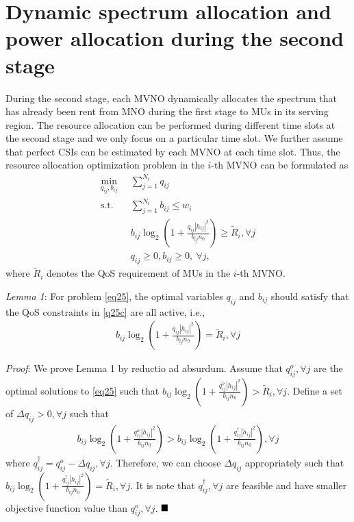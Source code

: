 \documentclass[journal]{IEEEtran}
\begin{document}
\section{Dynamic spectrum allocation and power allocation during the second stage}
During the second stage, each MVNO dynamically allocates the spectrum that has already been rent from MNO during the first stage to MUs in its serving region. The resource allocation can be performed during different time slots at the second stage and we only focus on a particular time slot. We further assume that perfect CSIs can be estimated by each MVNO at each time slot. Thus, the resource allocation optimization problem in the $i$-th MVNO can be formulated as
\begin{subequations}\label{eq25}
	\begin{align}
	\min_{q_{ij}, b_{ij}}\ & \sum\limits_{j = 1}^{N_i} q_{ij} \label{q25a} \\ \mbox{s.t.} \quad &  \sum\limits_{j = 1}^{N_i} b_{ij} \leq w_i \label{q25b} \\ \quad &  b_{ij}\log_2\left(1 + \frac{q_{ij}\left|h_{ij}\right|^2}{b_{ij}n_0}\right) \geq \tilde{R}_i, \forall j \label{q25c}\\
	& q_{ij} \geq 0, b_{ij} \geq 0, \ \forall j, \label{q25d}
	\end{align}
\end{subequations}
where $\tilde{R}_i$ denotes the QoS requirement of MUs in the $i$-th MVNO.

\textit{Lemma 1}: For problem \eqref{eq25}, the optimal variables $q_{ij}$ and $b_{ij}$ should satisfy that the QoS constraints in \eqref{q25c} are all active, i.e., 
\begin{align} \label{q26}
b_{ij}\log_2\left(1 + \frac{q_{ij}\left|h_{ij}\right|^2}{b_{ij}n_0}\right) = \tilde{R}_i,  \forall j
\end{align}

\textit{Proof}:  
We prove Lemma 1 by reductio ad absurdum. Assume that $q_{ij}^o, \forall j$ are the optimal solutions to \eqref{eq25} such that $b_{ij}\log_2\left(1 + \frac{q_{ij}^o\left|h_{ij}\right|^2}{b_{ij}n_0}\right) > \tilde{R}_i, \forall j$. Define a set of $\Delta q_{ij} > 0, \forall j$ such that 
\begin{align}
b_{ij}\log_2\left(1 + \frac{q_{ij}^o\left|h_{ij}\right|^2}{b_{ij}n_0}\right) > b_{ij}\log_2\left(1 + \frac{q_{ij}^\dag\left|h_{ij}\right|^2}{b_{ij}n_0}\right), \forall j
\end{align}
where $q_{ij}^\dag = q_{ij}^o - \Delta q_{ij}, \forall j$. Therefore, we can choose $\Delta q_{ij}$ appropriately such that $b_{ij}\log_2\left(1 + \frac{q_{ij}^\dag\left|h_{ij}\right|^2}{b_{ij}n_0}\right) = \tilde{R}_i, \forall j$. It is note that $q_{ij}^\dag, \forall j$ are feasible and have smaller objective function value than $q_{ij}^o, \forall j$.
$\hfill\blacksquare$
\end{document}
